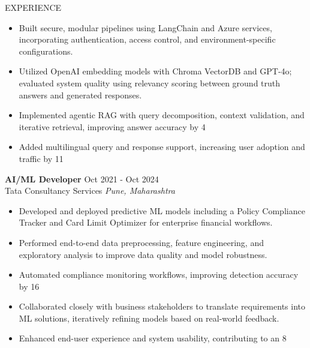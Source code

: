 \documentclass{resume}
\begin{document}
\begin{rSection}{EXPERIENCE}
\begin{itemize}
    \item Built secure, modular pipelines using LangChain and Azure services, incorporating authentication, access control, and environment-specific configurations.
    
    \item Utilized OpenAI embedding models with Chroma VectorDB and GPT-4o; evaluated system quality using relevancy scoring between ground truth answers and generated responses.
    
    \item Implemented agentic RAG with query decomposition, context validation, and iterative retrieval, improving answer accuracy by 4%
    
    \item Added multilingual query and response support, increasing user adoption and traffic by 11%
    
 \end{itemize}

\textbf{ AI/ML Developer } \hfill Oct 2021 - Oct 2024\\
Tata Consultancy Services \hfill \textit{ Pune, Maharashtra }
 \begin{itemize}
    \itemsep -3pt {} 
    
    \item Developed and deployed predictive ML models including a Policy Compliance Tracker and Card Limit Optimizer for enterprise financial workflows.
    
    \item Performed end-to-end data preprocessing, feature engineering, and exploratory analysis to improve data quality and model robustness.
    
    \item Automated compliance monitoring workflows, improving detection accuracy by 16%
    
    \item Collaborated closely with business stakeholders to translate requirements into ML solutions, iteratively refining models based on real-world feedback.
    
    \item Enhanced end-user experience and system usability, contributing to an 8%
    
 \end{itemize}

\end{rSection} 
\end{document}

